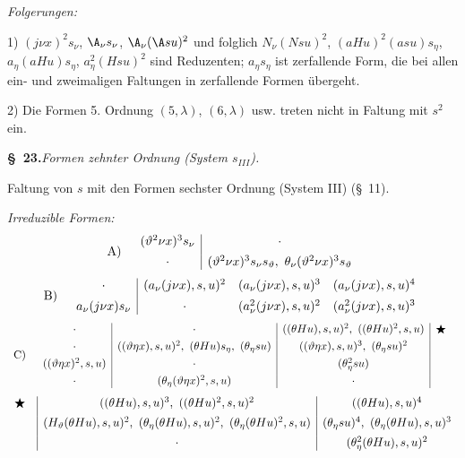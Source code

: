 \noindent\emph{Folgerungen:}

1) $(j\nu x)^2s_\nu$, $\A_\nu s_\nu$, $\A_\nu(\A su)^2$ und folglich $N_\nu(Nsu)^2$, $(aHu)^2(asu)s_\eta$, $a_\eta(aHu)s_\eta$, $a_\eta^2(Hsu)^2$ sind Reduzenten; $a_\eta s_\eta$ ist zerfallende Form, die bei allen ein- und zweimaligen Faltungen in zerfallende Formen übergeht.

2) Die Formen 5. Ordnung $(5,\lambda)$, $(6,\lambda)$ usw. treten nicht in Faltung mit $s^2$ ein.


\begin{center}\textbf{\S\ 23.}\quad\emph{Formen zehnter Ordnung (System $s_{III}$).}\end{center}
Faltung von $s$ mit den Formen sechster Ordnung (System III) (\S\ 11).

\noindent\emph{Irreduzible Formen:}
\[
\begin{array}{r@{\quad}c}
\text{A)}&
\begin{array}{c|c}
(\vartheta^2\nu x)^3s_\nu&\cdot\\[0.45em]
\cdot&(\vartheta^2\nu x)^3s_\nu s_\vartheta,\ \theta_\nu(\vartheta^2\nu x)^3s_\vartheta
\end{array}
\end{array}
\]
\[
\begin{array}{r@{\quad}c}
\text{B)}&
\begin{array}{c|ccc}
\cdot&(a_\nu(j\nu x),s,u)^2&(a_\nu(j\nu x),s,u)^3&(a_\nu(j\nu x),s,u)^4\\[0.45em]
a_\nu(j\nu x)s_\nu&\cdot&(a_\nu^2(j\nu x),s,u)^2&(a_\nu^2(j\nu x),s,u)^3
\end{array}
\end{array}
\]
\[
\begin{array}{r@{\quad}c}
\text{C)}&
\begin{array}{c|c|c|c}
\cdot&\cdot&((\theta Hu),s,u)^2,\ ((\theta Hu)^2,s,u)&\bigstar\\[0.35em]
\cdot&((\vartheta\eta x),s,u)^2,\ (\theta Hu)s_\eta,\ (\theta_\eta su)&((\vartheta\eta x),s,u)^3,\ (\theta_\eta su)^2&\\[0.35em]
((\vartheta\eta x)^2,s,u)&\cdot&(\theta_\eta^2su)&\\[0.35em]
\cdot&(\theta_\eta(\vartheta\eta x)^2,s,u)&\cdot&
\end{array}
\end{array}
\]
\[
\begin{array}{c@{\quad}|c|c}
\bigstar&((\theta Hu),s,u)^3,\ ((\theta Hu)^2,s,u)^2&((\theta Hu),s,u)^4\\[0.45em]
&(H_\vartheta(\theta Hu),s,u)^2,\ (\theta_\eta(\theta Hu),s,u)^2,\ (\theta_\eta(\theta Hu)^2,s,u)&(\theta_\eta su)^4,\ (\theta_\eta(\theta Hu),s,u)^3\\[0.45em]
&\cdot&(\theta_\eta^2(\theta Hu),s,u)^2
\end{array}
\]


